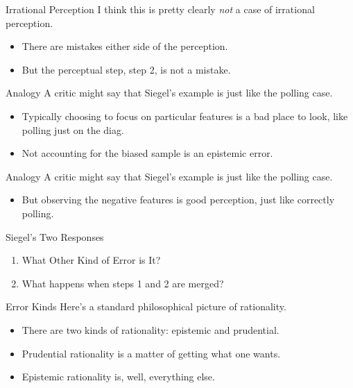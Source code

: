 \documentclass[
  17pt,
  letterpaper,
  ignorenonframetext,
  aspectratio=169,
  handout,
  xcolor={dvipsnames}]{beamer}
\providecommand{\tightlist}{%
  \setlength{\itemsep}{0pt}\setlength{\parskip}{0pt}}\usepackage{longtable,booktabs,array}
\begin{document}
\begin{frame}{Irrational Perception}
\protect\hypertarget{irrational-perception}{}
I think this is pretty clearly \emph{not} a case of irrational
perception.

\begin{itemize}[<+->]
\tightlist
\item
  There are mistakes either side of the perception.
\item
  But the perceptual step, step 2, is not a mistake.
\end{itemize}
\end{frame}

\begin{frame}{Analogy}
\protect\hypertarget{analogy}{}
A critic might say that Siegel's example is just like the polling case.

\begin{itemize}[<+->]
\tightlist
\item
  Typically choosing to focus on particular features is a bad place to
  look, like polling just on the diag.
\item
  Not accounting for the biased sample is an epistemic error.
\end{itemize}
\end{frame}

\begin{frame}{Analogy}
\protect\hypertarget{analogy-1}{}
A critic might say that Siegel's example is just like the polling case.

\begin{itemize}[<+->]
\tightlist
\item
  But observing the negative features is good perception, just like
  correctly polling.
\end{itemize}
\end{frame}

\begin{frame}{Siegel's Two Responses}
\protect\hypertarget{siegels-two-responses}{}
\begin{enumerate}[<+->]
\tightlist
\item
  What Other Kind of Error is It?
\item
  What happens when steps 1 and 2 are merged?
\end{enumerate}
\end{frame}

\begin{frame}{Error Kinds}
\protect\hypertarget{error-kinds}{}
Here's a standard philosophical picture of rationality.

\begin{itemize}[<+->]
\tightlist
\item
  There are two kinds of rationality: epistemic and prudential.
\item
  Prudential rationality is a matter of getting what one wants.
\item
  Epistemic rationality is, well, everything else.
\end{itemize}
\end{frame}
\end{document}
